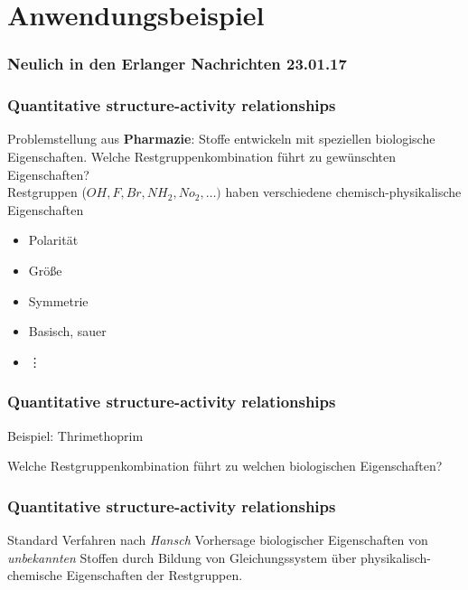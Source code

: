 \section{Anwendungsbeispiel}
\begin{frame}
	\frametitle{Neulich in den Erlanger Nachrichten 23.01.17}
\end{frame}

\begin{frame}
	\frametitle{Quantitative structure-activity relationships}
	Problemstellung aus \textbf{Pharmazie}: Stoffe entwickeln mit speziellen biologische Eigenschaften.
	Welche Restgruppenkombination führt zu gewünschten Eigenschaften?\\

	Restgruppen ($OH, F, Br, NH_2, No_2, \ldots)$ haben verschiedene
	chemisch-physikalische Eigenschaften
	\begin{itemize}
		\item Polarität
		\item Größe
		\item Symmetrie
		\item Basisch, sauer
		\item {\hspace{5pt}\vdots}
	\end{itemize}
\end{frame}
\begin{frame}
	\frametitle{Quantitative structure-activity relationships}
	\begin{block}{Beispiel: Thrimethoprim}
	\end{block}
	Welche Restgruppenkombination führt zu welchen biologischen Eigenschaften?
\end{frame}

\begin{frame}
	\frametitle{Quantitative structure-activity relationships}
	\begin{block}{Standard Verfahren nach \textit{Hansch}}
	Vorhersage biologischer Eigenschaften von \emph{unbekannten} Stoffen
	durch Bildung von Gleichungssystem über physikalisch-chemische Eigenschaften der Restgruppen.
	\end{block}
\end{frame}

